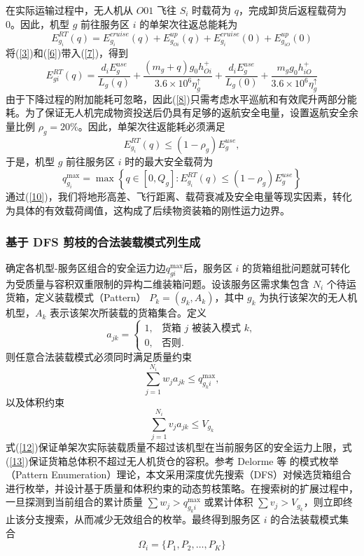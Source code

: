 在实际运输过程中，无人机从 $O01$ 飞往 $S_i$ 时载荷为 $q$，完成卸货后返程载荷为 0。因此，机型 $g$ 前往服务区 $i$ 的单架次往返总能耗为
\begin{equation}
	E_{g_i}^{RT}(q) = E_{g_i}^{cruise}(q) + E_{g_{Oi}}^{up}(q) + E_{g_i}^{cruise}(0) + E_{g_{iO}}^{up}(0)
\end{equation}
将(\ref{3})和(\ref{6})带入(\ref{7})，得到
\begin{equation}
	E_{gi}^{RT}(q) = \frac{d_i E_g^{use}}{L_g(q)} + \frac{(m_g + q)g_0 h_{Oi}^+}{3.6 \times 10^6 \eta_g^\uparrow} + \frac{d_i E_g^{use}}{L_g(0)} + \frac{m_g g_0 h_{iO}^+}{3.6 \times 10^6 \eta_g^\uparrow}
\end{equation}
由于下降过程的附加能耗可忽略，因此(\ref{8})只需考虑水平巡航和有效爬升两部分能耗。为了保证无人机完成物资投送后仍具有足够的返航安全电量，设置返航安全余量比例 $\rho_g = 20\%$。因此，单架次往返能耗必须满足
\begin{equation}
	E_{g_i}^{RT}(q) \leq (1 - \rho_g)E_g^{use},
\end{equation}
于是，机型 $g$ 前往服务区 $i$ 时的最大安全载荷为
\begin{equation}
	q_{g_i}^{\max} = \max \left\{ q \in [0, Q_g] : E_{g_i}^{RT}(q) \leq (1 - \rho_g)E_g^{use} \right\}
\end{equation}
通过(\ref{10})，我们将地形高差、飞行距离、载荷衰减及安全电量等现实因素，转化为具体的有效载荷阈值，这构成了后续物资装箱的刚性运力边界。
\subsubsection{基于 DFS 剪枝的合法装载模式列生成}
确定各机型-服务区组合的安全运力边$q_{gi}^{\max}$后，服务区 $i$ 的货箱组批问题就可转化为受质量与容积双重限制的异构二维装箱问题。设该服务区需求集包含 $N_i$ 个待运货箱，定义装载模式（Pattern） $P_k = (g_k, A_k)$，其中 $g_k$ 为执行该架次的无人机机型，$A_k$ 表示该架次所装载的货箱集合。定义
\begin{equation}
	a_{jk} = \begin{cases} 1, & \text{货箱 } j \text{ 被装入模式 } k, \\ 0, & \text{否则}. \end{cases}
\end{equation}
则任意合法装载模式必须同时满足质量约束
\begin{equation}
	\sum_{j=1}^{N_i} w_j a_{jk} \leq q_{g_k i}^{\max}, 
\end{equation}
以及体积约束
\begin{equation}
	\sum_{j=1}^{N_i} v_j a_{jk} \leq V_{g_k}
\end{equation}
式(\ref{12})保证单架次实际装载质量不超过该机型在当前服务区的安全运力上限，式(\ref{13})保证货箱总体积不超过无人机货仓的容积。参考 Delorme 等 \cite{delorme2016bin} 的模式枚举（Pattern Enumeration）理论，本文采用深度优先搜索（DFS）对候选货箱组合进行枚举，并设计基于质量和体积约束的动态剪枝策略。在搜索树的扩展过程中，一旦探测到当前组合的累计质量 $\sum w_j > q_{g_k i}^{\max}$ 或累计体积 $\sum v_j > V_{g_k}$，则立即终止该分支搜索，从而减少无效组合的枚举。最终得到服务区 $i$ 的合法装载模式集合
\begin{equation}
	\Omega_i = \{P_1, P_2, \dots, P_K\}
\end{equation} 
